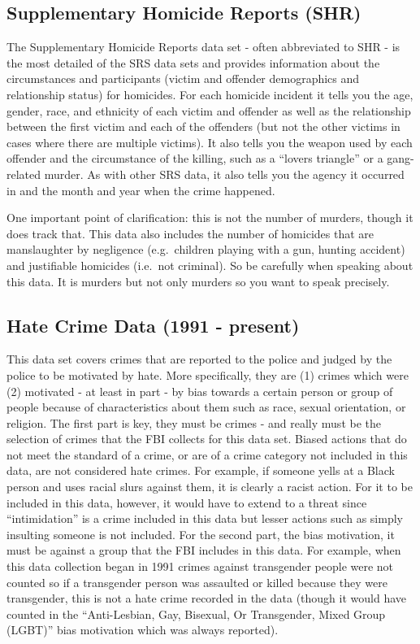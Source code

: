 \documentclass[
]{krantz}
\begin{document}
\subsection{Supplementary Homicide Reports
(SHR)}\label{supplementary-homicide-reports-shr}

The Supplementary Homicide Reports data set - often
abbreviated to SHR - is the most detailed of the SRS
data sets and provides information about the circumstances
and participants (victim and offender demographics and
relationship status) for homicides. For each homicide
incident it tells you the age, gender, race, and ethnicity
of each victim and offender as well as the relationship
between the first victim and each of the offenders (but not
the other victims in cases where there are multiple
victims). It also tells you the weapon used by each offender
and the circumstance of the killing, such as a ``lovers
triangle'' or a gang-related murder. As with other SRS data,
it also tells you the agency it occurred in and the month
and year when the crime happened.

One important point of clarification: this is not the number
of murders, though it does track that. This data also
includes the number of homicides that are manslaughter by
negligence (e.g.~children playing with a gun, hunting
accident) and justifiable homicides (i.e.~not criminal). So
be carefully when speaking about this data. It is murders
but not only murders so you want to speak precisely.

\subsection{Hate Crime Data (1991 -
present)}\label{hate-crime-data-1991---present}

This data set covers crimes that are reported to the police
and judged by the police to be motivated by hate. More
specifically, they are (1) crimes which were (2) motivated -
at least in part - by bias towards a certain person or group
of people because of characteristics about them such as
race, sexual orientation, or religion. The first part is
key, they must be crimes - and really must be the selection
of crimes that the FBI collects for this data set. Biased
actions that do not meet the standard of a crime, or are of
a crime category not included in this data, are not
considered hate crimes. For example, if someone yells at a
Black person and uses racial slurs against them, it is
clearly a racist action. For it to be included in this data,
however, it would have to extend to a threat since
``intimidation'' is a crime included in this data but lesser
actions such as simply insulting someone is not included.
For the second part, the bias motivation, it must be against
a group that the FBI includes in this data. For example,
when this data collection began in 1991 crimes against
transgender people were not counted so if a transgender
person was assaulted or killed because they were
transgender, this is not a hate crime recorded in the data
(though it would have counted in the ``Anti-Lesbian, Gay,
Bisexual, Or Transgender, Mixed Group (LGBT)'' bias
motivation which was always reported).
\end{document}

